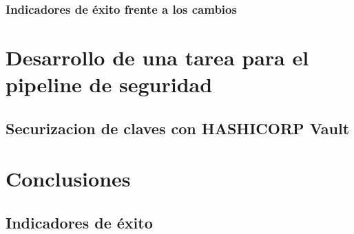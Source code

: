 \documentclass[12pt]{report} %
\begin{document}
\subsection{Indicadores de éxito frente a los cambios}

\chapter{Desarrollo de una tarea para el pipeline de seguridad}

\section{Securizacion de claves con HASHICORP Vault}







\chapter{Conclusiones}

\section{Indicadores de éxito}

\clearpage

\printglossary[type=\acronymtype]

\printglossary




\end{document}
